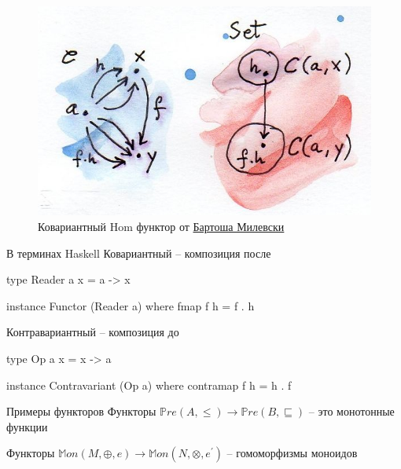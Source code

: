 \documentclass[
  russian,
  aspectratio=169,
  xcolor={svgnames},
  hyperref={colorlinks,citecolor=DeepPink4,linkcolor=DarkRed,urlcolor=DarkBlue}]{beamer}
\begin{document}
\begin{frame}[fragile]
\begin{figure}
\includegraphics{hom-functor.jpg}
\caption{Ковариантный Hom функтор от \href{https://bartoszmilewski.files.wordpress.com/2015/07/hom-functor.jpg}{Бартоша Милевски}}
\end{figure}


\end{frame}

\begin{frame}[fragile]{В терминах Haskell}
Ковариантный -- композиция после
\begin{hslisting}
type Reader a x = a -> x

instance Functor (Reader a) where
    fmap f h = f . h 
\end{hslisting}
Контравариантный -- композиция до
\begin{hslisting}
type Op a x = x -> a

instance Contravariant (Op a) where
    contramap f h = h . f
\end{hslisting}

\end{frame}



\begin{frame}[fragile]{Примеры функторов}
Функторы $\mathbb{P}re(A, \leqslant) \rightarrow \mathbb{P}re(B, \sqsubseteq)$ -- это монотонные функции
\vspace{1cm}

Функторы $\mathbb{M}on(M, \oplus, e) \rightarrow \mathbb{M}on(N, \otimes, e^{\prime})$ -- гомоморфизмы моноидов



\end{frame}
\end{document}
